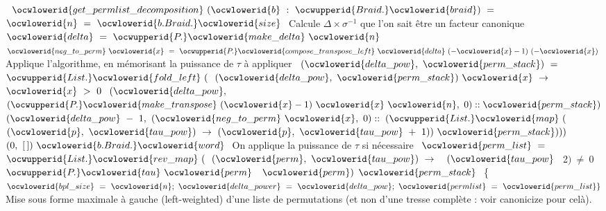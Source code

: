 \documentclass[12pt]{article}
\begin{document}
\ocweol
\label{Canonical.ml:1226}%
\medskip
\ocwbegincode{}\ocwindent{0.00em}
~$\ocwlowerid{get\_permlist\_decomposition}~(\ocwlowerid{b}~:~\ocwupperid{Braid.}\ocwlowerid{braid})~=~$\ocweol
\ocwindent{2.00em}
~$\ocwlowerid{n}~=~\ocwlowerid{b.Braid.}\ocwlowerid{size}~$\ocweol
\ocwindent{2.00em}
\ocwbc{} Calcule $\Delta \times \sigma^{-1}$ que l'on sait être un facteur canonique \ocwec{}\ocweol
\ocwindent{2.00em}
~$\ocwlowerid{delta}~=~\ocwupperid{P.}\ocwlowerid{make\_delta}~\ocwlowerid{n}~$\ocweol
\ocwindent{2.00em}
~$\ocwlowerid{neg\_to\_perm}~\ocwlowerid{x}~=~\ocwupperid{P.}\ocwlowerid{compose\_transpose\_left}~\ocwlowerid{delta}~(-\ocwlowerid{x}-1)~(-\ocwlowerid{x})~$\ocweol
\ocwindent{2.00em}
\ocwbc{} Applique l'algorithme, en mémorisant la puissance de $\tau$ à appliquer \ocwec{}\ocweol
\ocwindent{2.00em}
~$(\ocwlowerid{delta\_pow},~\ocwlowerid{perm\_stack})~=~$\ocweol
\ocwindent{4.00em}
$\ocwupperid{List.}\ocwlowerid{fold\_left}~($~$(\ocwlowerid{delta\_pow},~\ocwlowerid{perm\_stack})~\ocwlowerid{x}~\rightarrow{}$\ocweol
\ocwindent{13.00em}
~$\ocwlowerid{x}~>~0~$\ocweol
\ocwindent{14.00em}
$(\ocwlowerid{delta\_pow},~$\ocweol
\ocwindent{14.00em}
$(\ocwupperid{P.}\ocwlowerid{make\_transpose}~(\ocwlowerid{x}-1)~\ocwlowerid{x}~\ocwlowerid{n},~0)::\ocwlowerid{perm\_stack})$\ocweol
\ocwindent{13.00em}
\ocweol
\ocwindent{14.00em}
$(\ocwlowerid{delta\_pow}~-~1,$\ocweol
\ocwindent{14.50em}
$(\ocwlowerid{neg\_to\_perm}~\ocwlowerid{x},~0)::$\ocweol
\ocwindent{14.50em}
$(\ocwupperid{List.}\ocwlowerid{map}~($~$(\ocwlowerid{p},~\ocwlowerid{tau\_pow})~\rightarrow{}~(\ocwlowerid{p},~\ocwlowerid{tau\_pow}~+~1))~\ocwlowerid{perm\_stack})))$\ocweol
\ocwindent{11.50em}
$(0,~[\,])~\ocwlowerid{b.Braid.}\ocwlowerid{word}~$\ocweol
\ocwindent{2.00em}
\ocwbc{} On applique la puissance de $\tau$ si nécessaire \ocwec{}\ocweol
\ocwindent{2.00em}
~$\ocwlowerid{perm\_list}~=$\ocweol
\ocwindent{4.00em}
$\ocwupperid{List.}\ocwlowerid{rev\_map}~($~$(\ocwlowerid{perm},~\ocwlowerid{tau\_pow})~\rightarrow{}~$~$(\ocwlowerid{tau\_pow}~$~2$)~\not=~0$\ocweol
\ocwindent{24.00em}
~$\ocwupperid{P.}\ocwlowerid{tau}~\ocwlowerid{perm}$\ocweol
\ocwindent{24.00em}
~$\ocwlowerid{perm})$\ocweol
\ocwindent{10.50em}
$\ocwlowerid{perm\_stack}~$\ocweol
\ocwindent{2.00em}
\{$\ocwlowerid{bpl\_size}~=~\ocwlowerid{n};~\ocwlowerid{delta\_power}~=~\ocwlowerid{delta\_pow};~\ocwlowerid{permlist}~=~\ocwlowerid{perm\_list}\}$\ocweol
\ocwendcode{}\allowbreak\ocwsection
\label{Canonical.ml:2470}%
Mise sous forme maximale à gauche (left-weighted) d'une liste de permutations (et non
   d'une tresse complète : voir canonicize pour celà).
   
\end{document}
